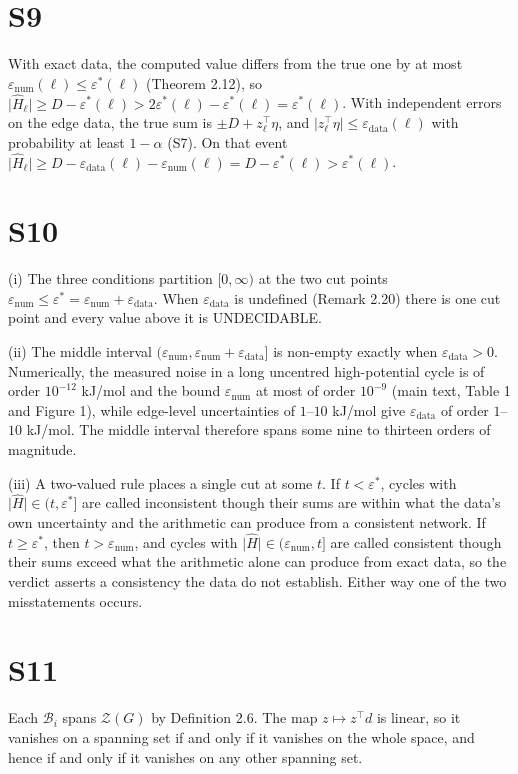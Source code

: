 \documentclass[11pt,a4paper]{article}
\theoremstyle{definition}
\theoremstyle{remark}
\newcommand{\abs}[1]{\lvert#1\rvert}
\newcommand{\eps}{\varepsilon}
\newcommand{\epsnum}{\eps_{\mathrm{num}}}
\newcommand{\epsdata}{\eps_{\mathrm{data}}}
\newcommand{\epsstar}{\eps^{\ast}}
\newcommand{\hol}{H}
\begin{document}
\section*{S9}
With exact data, the computed value differs from the true one by at most
$\epsnum(\ell)\le\epsstar(\ell)$ (Theorem 2.12), so
$\abs{\widehat{\hol}_\ell} \ge D - \epsstar(\ell) > 2\epsstar(\ell) -
\epsstar(\ell) = \epsstar(\ell)$. With independent errors on the edge
data, the true sum is $\pm D+z_\ell^{\top}\eta$, and
$\abs{z_\ell^{\top}\eta}\le\epsdata(\ell)$ with probability at least
$1-\alpha$ (S7). On that event
$\abs{\widehat{\hol}_\ell}\ge D-\epsdata(\ell)-\epsnum(\ell)
=D-\epsstar(\ell)>\epsstar(\ell)$.

\section*{S10}
(i) The three conditions partition $[0,\infty)$ at the two cut points
$\epsnum \le \epsstar = \epsnum+\epsdata$. When $\epsdata$ is undefined
(Remark 2.20) there is one cut point and every value above it is
\textsf{UNDECIDABLE}.

(ii) The middle interval $(\epsnum,\epsnum+\epsdata]$ is non-empty
exactly when $\epsdata>0$. Numerically, the measured noise in a long
uncentred high-potential cycle is of order $10^{-12}$ kJ/mol and the
bound $\epsnum$ at most of order $10^{-9}$ (main text, Table 1 and
Figure 1), while edge-level uncertainties of $1$--$10$
kJ/mol \citep{noor2013,flamholz2012} give $\epsdata$ of order $1$--$10$
kJ/mol. The middle interval therefore spans some nine to thirteen orders
of magnitude.

(iii) A two-valued rule places a single cut at some $t$. If
$t<\epsstar$, cycles with $\abs{\widehat{\hol}}\in(t,\epsstar]$ are
called inconsistent though their sums are within what the data's own
uncertainty and the arithmetic can produce from a consistent network. If
$t\ge\epsstar$, then $t>\epsnum$, and cycles with
$\abs{\widehat{\hol}}\in(\epsnum,t]$ are called consistent though their
sums exceed what the arithmetic alone can produce from exact data, so
the verdict asserts a consistency the data do not establish. Either way
one of the two misstatements occurs.

\section*{S11}
Each $\mathcal{B}_i$ spans $\mathcal{Z}(G)$ by Definition 2.6.
The map $z\mapsto z^{\top}d$ is linear, so it vanishes on a spanning set
if and only if it vanishes on the whole space, and hence if and only if
it vanishes on any other spanning set.
\end{document}
